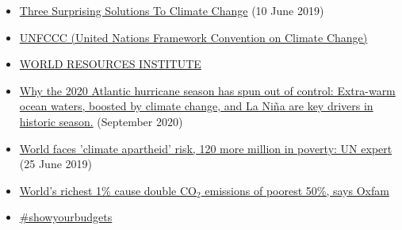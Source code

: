 \documentclass[12pt]{article}
\begin{document}
\begin{itemize}
 \vspace{-.2cm} \item \href{https://www.forbes.com/sites/jeffmcmahon/2019/06/10/three-surprising-solutions-to-climate-change/?fbclid=IwAR3Drvr1uwPLKrYN2H1Rx-wOI3XsH51a7yGOC-7Pi0ebt9e_osxvlAlM0s8#77c983fe6742}{Three Surprising Solutions To Climate Change} (10 June 2019)
 \vspace{-.2cm} \item \href{https://unfccc.int/}{UNFCCC (United Nations Framework Convention on Climate Change)} 
 \vspace{-.2cm} \item \href{https://www.wri.org/}{WORLD RESOURCES INSTITUTE} 
 \vspace{-.2cm} \item \href{https://www.washingtonpost.com/weather/2020/09/23/atlantic-hurricanes-record-2020/?utm_campaign=Carbon\%20Brief\%20Daily\%20Briefing&utm_medium=email&utm_source=Revue\%20newsletter}{Why the 2020 Atlantic hurricane season has spun out of control: Extra-warm ocean waters, boosted by climate change, and La Ni{\~n}a are key drivers in historic season.} (September 2020)
 \vspace{-.2cm} \item \href{https://news.un.org/en/story/2019/06/1041261}{World faces 'climate apartheid' risk, 120 more million in poverty: UN expert} (25 June 2019)
 \vspace{-.2cm} \item \href{https://www.theguardian.com/environment/2020/sep/21/worlds-richest-1-cause-double-co2-emissions-of-poorest-50-says-oxfam?utm_campaign=Carbon\%20Brief\%20Daily\%20Briefing&utm_medium=email&utm_source=Revue\%20newsletter}{World's richest 1\% cause double CO$_2$ emissions of poorest 50\%, says Oxfam} 
 \vspace{-.2cm} \item \href{https://www.showyourbudgets.org/de/?country=whole_world}{\#showyourbudgets} 
 \end{itemize}

 
\end{document}
